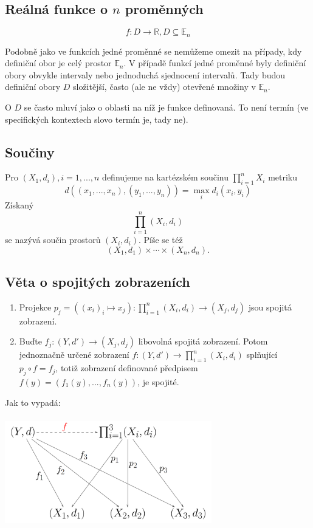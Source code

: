 \documentclass[../main.tex]{subfiles}
\begin{document}
\subsection{Reálná funkce o $n$ proměnných}
\hspace{1.2mm}
\[f: D \rightarrow \mathbb{R}, D \subseteq \mathbb{E}_n\]

\noindent
\hspace{1.2mm}
Podobně jako ve funkcích jedné proměnné se nemůžeme omezit na případy, kdy definiční obor je celý prostor $\mathbb{E}_n$.  
V případě funkcí jedné proměnné byly definiční obory obvykle intervaly nebo jednoduchá sjednocení intervalů. Tady budou definiční
obory $D$ složitější, často (ale ne vždy) otevřené množiny v $\mathbb{E}_n$.

O $D$ se často mluví jako o oblasti na níž je funkce definovaná. To není termín (ve specifických kontextech slovo  termín 
je, tady ne).

\subsection{Součiny}
\hspace{1.2mm}
Pro $(X_1,d_i), i = 1,...,n$ definujeme na kartézském součinu $\prod^n_{i=1}X_i$ metriku
\[d((x_1,...,x_n),(y_1,...,y_n)) = \max_i d_i(x_i,y_i)\]
Získaný
\[\prod^n_{i=1}(X_i,d_i)\]
se nazývá součin prostorů $(X_i, d_i)$. Píše se též 
\[(X_1,d_1) \times \cdots \times (X_n,d_n).\]

\subsection{Věta o spojitých zobrazeních}
\begin{enumerate}
\item Projekce $p_j = ((x_i)_i \mapsto x_j) : \prod^n_{i=1}(X_i,d_i) \rightarrow (X_j,d_j)$ jsou spojitá zobrazení.

\item Buďte $f_j:(Y,d') \rightarrow (X_j,d_j)$ libovolná spojitá zobrazení. Potom jednoznačně určené zobrazení 
$f:(Y,d') \rightarrow \prod^n_{i=1}(X_i,d_i)$ splňující $p_j \circ f = f_j$, totiž zobrazení definované předpisem
$f(y) = (f_1(y),...,f_n(y))$, je spojité.
\end{enumerate}
Jak to vypadá:
\begin{center}
\includegraphics[width=9cm,height=4.8cm]{ipkm.png}
\end{center}
\end{document}
